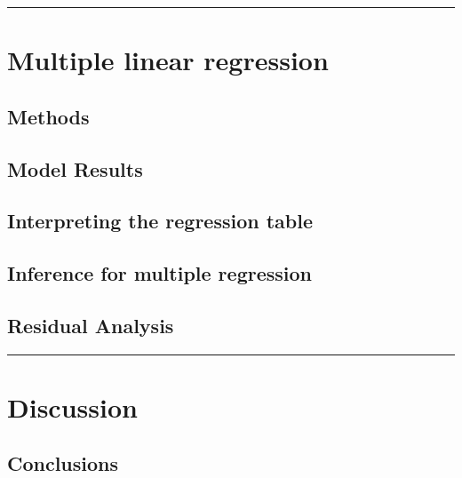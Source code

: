 \documentclass[
]{article}
\begin{document}
\begin{center}\rule{0.5\linewidth}{0.5pt}\end{center}

\hypertarget{multiple-linear-regression}{%
\section{Multiple linear regression}\label{multiple-linear-regression}}

\hypertarget{methods}{%
\subsection{Methods}\label{methods}}

\hypertarget{model-results}{%
\subsection{Model Results}\label{model-results}}

\hypertarget{interpreting-the-regression-table}{%
\subsection{Interpreting the regression
table}\label{interpreting-the-regression-table}}

\hypertarget{inference-for-multiple-regression}{%
\subsection{Inference for multiple
regression}\label{inference-for-multiple-regression}}

\hypertarget{residual-analysis}{%
\subsection{Residual Analysis}\label{residual-analysis}}

\begin{center}\rule{0.5\linewidth}{0.5pt}\end{center}

\hypertarget{discussion}{%
\section{Discussion}\label{discussion}}

\hypertarget{conclusions}{%
\subsection{Conclusions}\label{conclusions}}
\end{document}

